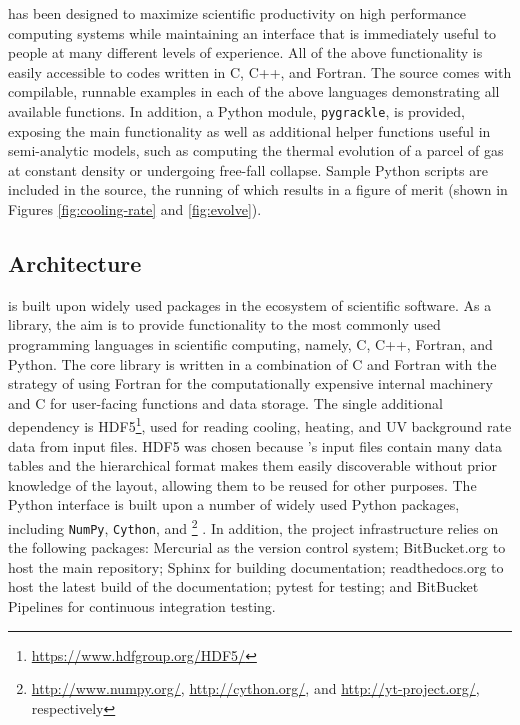 \grackle{} has been designed to maximize scientific productivity on
high performance computing systems while maintaining an interface that
is immediately useful to people at many different levels of
experience.
All of the above functionality is easily accessible to codes written
in C, C++, and Fortran.  The \grackle{} source comes with compilable,
runnable examples in each of the above languages demonstrating all
available functions.  In addition, a Python module, \texttt{pygrackle},
is provided, exposing the main functionality as well as additional helper
functions useful in semi-analytic models, such as computing the
thermal evolution of a parcel of gas at constant density or undergoing
free-fall collapse.  Sample Python scripts are included in the source,
the running of which results in a figure of merit (shown in Figures
\ref{fig:cooling-rate} and \ref{fig:evolve}).

\subsection{\grackle{} Architecture}

\grackle{} is built upon widely used packages in the ecosystem of
scientific software.  As a library, the aim is to provide
functionality to the most commonly used programming languages in
scientific computing, namely, C, C++, Fortran, and Python.  The core
library is written in a combination of C and Fortran with the strategy
of using Fortran for the computationally expensive internal machinery
and C for user-facing functions and data storage.  The single
additional dependency is
HDF5\footnote{\url{https://www.hdfgroup.org/HDF5/}}, used for reading
cooling, heating,
and UV background rate data from input files.  HDF5 was chosen because
\grackle{}'s input files contain many data tables and the hierarchical
format makes them easily discoverable without prior knowledge of the
layout, allowing them to be reused for other purposes.  The Python
interface is built upon a number of widely used Python packages, including
\texttt{NumPy}, \texttt{Cython}, and
\yt{}\footnote{\url{http://www.numpy.org/}, \url{http://cython.org/},
  and \url{http://yt-project.org/}, respectively} \citep[][an SI2-funded
project]{2011ApJS..192....9T}.  In
addition, the project infrastructure relies on the following packages:
Mercurial as the version control system; BitBucket.org to host the
main repository; Sphinx for building documentation; readthedocs.org to
host the latest build of the documentation; pytest for testing; and BitBucket
Pipelines for continuous integration testing.

